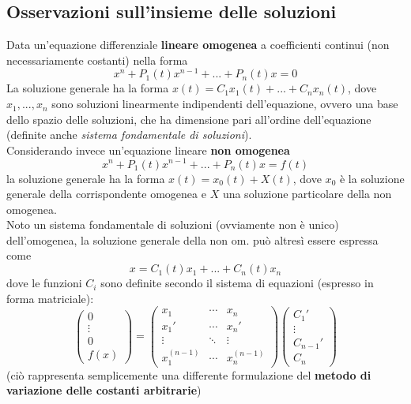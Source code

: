 \documentclass[10pt]{article}
\theoremstyle{plain}
\begin{document}
\subsection{Osservazioni sull'insieme delle soluzioni}
Data un'equazione differenziale \textbf{lineare omogenea} a coefficienti continui (non necessariamente costanti) nella forma
\[x^{n} + P_1(t) x^{n-1} + ... + P_n(t) x = 0\]
La soluzione generale ha la forma $\displaystyle x(t) = C_1 x_1(t) + ... + C_n x_n(t)$, dove $x_1, ..., x_n$ sono soluzioni linearmente indipendenti dell'equazione, ovvero una base dello spazio delle soluzioni, che ha dimensione pari all'ordine dell'equazione (definite anche \textit{sistema fondamentale di soluzioni}).
\\Considerando invece un'equazione lineare \textbf{non omogenea}
\[x^{n} + P_1(t) x^{n-1} + ... + P_n(t) x = f(t)\]
la soluzione generale ha la forma $x(t) = x_0(t) + X(t)$, dove $x_0$ è la soluzione generale della corrispondente omogenea e $X$ una soluzione particolare della non omogenea. 
\\Noto un sistema fondamentale di soluzioni (ovviamente non è unico) dell'omogenea, la soluzione generale della non om. può altresì essere espressa come 
\[x = C_1(t) x_1 + ... + C_n(t) x_n\]
dove le funzioni $C_i$ sono definite secondo il sistema di equazioni (espresso in forma matriciale):
\[\begin{pmatrix}
0\\
\vdots \\
0\\
f(x)
\end{pmatrix} = \begin{pmatrix}
x_1 & \cdots & x_n\\
x_1' & \cdots & x_n'\\
\vdots & \ddots & \vdots\\
x_1^{(n-1)} & \cdots & x_n^{(n-1)}
\end{pmatrix} \begin{pmatrix}
C_1'\\
\vdots \\
C_{n-1}'\\
C_n
\end{pmatrix}\]
(ciò rappresenta semplicemente una differente formulazione del \textbf{metodo di variazione delle costanti arbitrarie})
\end{document}

